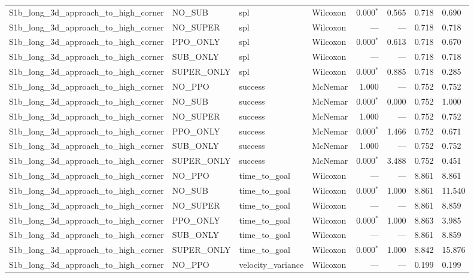 \begin{tabular}{llllrrrl}
  S1b_long_3d_approach_to_high_corner & NO_SUB & spl & Wilcoxon & 0.000$^{*}$ & 0.565 & 0.718 & 0.690 \\
  S1b_long_3d_approach_to_high_corner & NO_SUPER & spl & Wilcoxon & --- & --- & 0.718 & 0.718 \\
  S1b_long_3d_approach_to_high_corner & PPO_ONLY & spl & Wilcoxon & 0.000$^{*}$ & 0.613 & 0.718 & 0.670 \\
  S1b_long_3d_approach_to_high_corner & SUB_ONLY & spl & Wilcoxon & --- & --- & 0.718 & 0.718 \\
  S1b_long_3d_approach_to_high_corner & SUPER_ONLY & spl & Wilcoxon & 0.000$^{*}$ & 0.885 & 0.718 & 0.285 \\
  S1b_long_3d_approach_to_high_corner & NO_PPO & success & McNemar & 1.000 & --- & 0.752 & 0.752 \\
  S1b_long_3d_approach_to_high_corner & NO_SUB & success & McNemar & 0.000$^{*}$ & 0.000 & 0.752 & 1.000 \\
  S1b_long_3d_approach_to_high_corner & NO_SUPER & success & McNemar & 1.000 & --- & 0.752 & 0.752 \\
  S1b_long_3d_approach_to_high_corner & PPO_ONLY & success & McNemar & 0.000$^{*}$ & 1.466 & 0.752 & 0.671 \\
  S1b_long_3d_approach_to_high_corner & SUB_ONLY & success & McNemar & 1.000 & --- & 0.752 & 0.752 \\
  S1b_long_3d_approach_to_high_corner & SUPER_ONLY & success & McNemar & 0.000$^{*}$ & 3.488 & 0.752 & 0.451 \\
  S1b_long_3d_approach_to_high_corner & NO_PPO & time_to_goal & Wilcoxon & --- & --- & 8.861 & 8.861 \\
  S1b_long_3d_approach_to_high_corner & NO_SUB & time_to_goal & Wilcoxon & 0.000$^{*}$ & 1.000 & 8.861 & 11.540 \\
  S1b_long_3d_approach_to_high_corner & NO_SUPER & time_to_goal & Wilcoxon & --- & --- & 8.861 & 8.859 \\
  S1b_long_3d_approach_to_high_corner & PPO_ONLY & time_to_goal & Wilcoxon & 0.000$^{*}$ & 1.000 & 8.863 & 3.985 \\
  S1b_long_3d_approach_to_high_corner & SUB_ONLY & time_to_goal & Wilcoxon & --- & --- & 8.861 & 8.859 \\
  S1b_long_3d_approach_to_high_corner & SUPER_ONLY & time_to_goal & Wilcoxon & 0.000$^{*}$ & 1.000 & 8.842 & 15.876 \\
  S1b_long_3d_approach_to_high_corner & NO_PPO & velocity_variance & Wilcoxon & --- & --- & 0.199 & 0.199 \\

\end{tabular}
